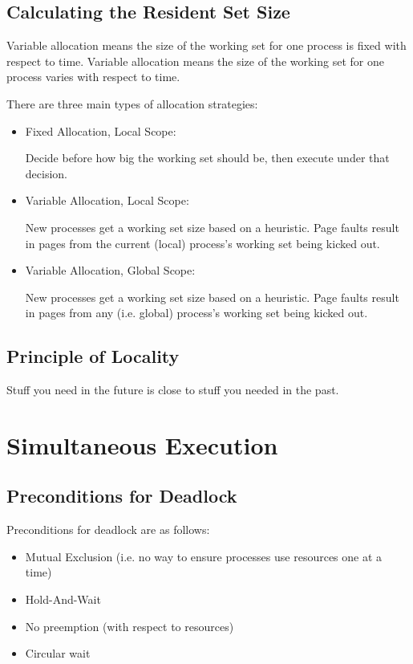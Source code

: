     \section{Calculating the Resident Set Size} %
    \label{sec:calculating_the_resident_set_size}
    Variable allocation means the size of the working set for one process is
    fixed with respect to time.
    Variable allocation means the size of the working set for one process varies
    with respect to time.

    There are three main types of allocation strategies:
    \begin{itemize}
        \item Fixed Allocation, Local Scope:

            Decide before how big the working set should be, then execute under
            that decision.

        \item Variable Allocation, Local Scope:

            New processes get a working set size based on a heuristic.
            Page faults result in pages from the current (local) process's
            working set being kicked out.

        \item Variable Allocation, Global Scope:

            New processes get a working set size based on a heuristic.
            Page faults result in pages from any (i.e. global) process's working
            set being kicked out.
    \end{itemize}
    \section{Principle of Locality} %
    \label{sec:principle_of_locality}
    Stuff you need in the future is close to stuff you needed in the past.

\chapter{Simultaneous Execution} %
\label{cha:simultaneous_execution}

    \section{Preconditions for Deadlock} %
    \label{sec:preconditions_for_deadlock}
    Preconditions for deadlock are as follows:
    \begin{itemize}
        \item Mutual Exclusion (i.e. no way to ensure processes use resources
        one at a time)
        \item Hold-And-Wait
        \item No preemption (with respect to resources)
        \item Circular wait
    \end{itemize}

